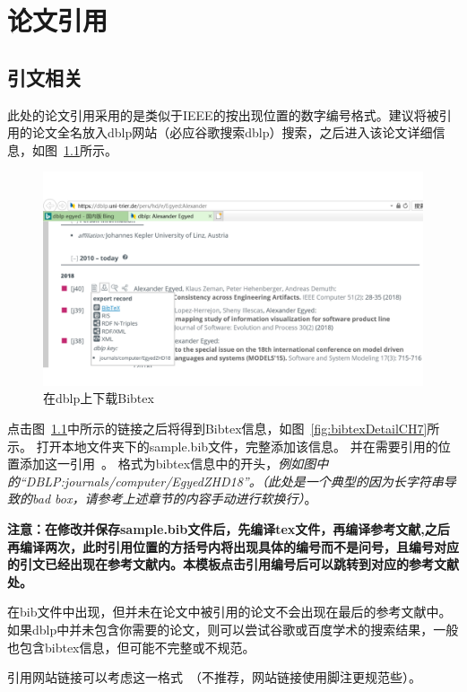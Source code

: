 \chapter{论文引用}

\section{引文相关}
此处的论文引用采用的是类似于IEEE的按出现位置的数字编号格式。建议将被引用的论文全名放入dblp网站（必应谷歌搜索dblp）搜索，之后进入该论文详细信息，如图~\ref{fig:dblpForBibtexCH7}所示。

\begin{figure}[htb]
  \centering
  \includegraphics[width=5in]{figure/chapter7/dblpForBibtex.pdf}
  \caption{在dblp上下载Bibtex}
  \label{fig:dblpForBibtexCH7}
\end{figure}

点击图~\ref{fig:dblpForBibtexCH7}中所示的链接之后将得到Bibtex信息，如图~\ref{fig:bibtexDetailCH7}所示。
打开本地文件夹下的sample.bib文件，完整添加该信息。
并在需要引用的位置添加这一引用~\cite{DBLP:journals/computer/EgyedZHD18}。
格式为bibtex信息中的开头，\emph{例如图中的“DBLP:journals/computer/EgyedZHD18”。（此处是一个典型的因为长字符串导致的bad box，请参考上述章节的内容手动进行软换行）}。

\textbf{注意：在修改并保存sample.bib文件后，先编译tex文件，再编译参考文献,之后再编译两次，此时引用位置的方括号内将出现具体的编号而不是问号，且编号对应的引文已经出现在参考文献内。本模板点击引用编号后可以跳转到对应的参考文献处。}

在bib文件中出现，但并未在论文中被引用的论文不会出现在最后的参考文献中。如果dblp中并未包含你需要的论文，则可以尝试谷歌或百度学术的搜索结果，一般也包含bibtex信息，但可能不完整或不规范。

引用网站链接可以考虑这一格式~\cite{GanttSystemWeb}（不推荐，网站链接使用脚注更规范些）。

